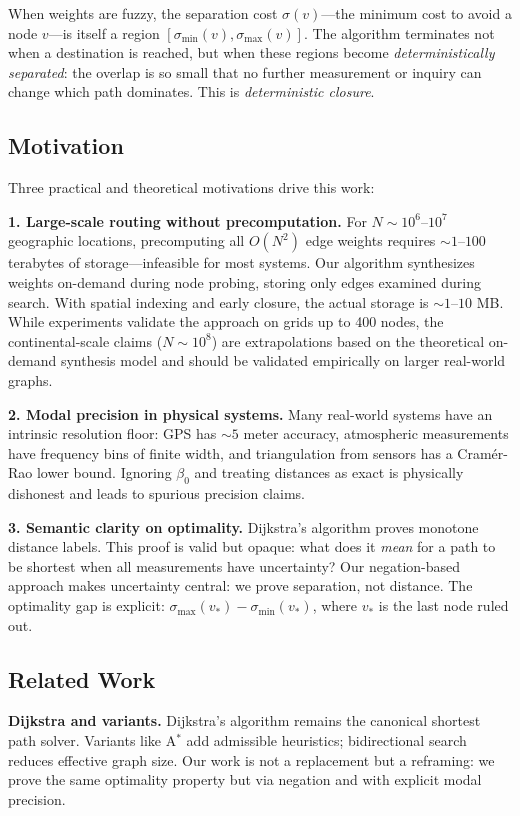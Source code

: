 \documentclass[twocolumn,11pt,a4paper]{article}
\theoremstyle{definition}
\begin{document}
When weights are fuzzy, the separation cost $\sigma(v)$---the minimum cost to avoid a node $v$---is itself a region $[\sigma_{\min}(v), \sigma_{\max}(v)]$. The algorithm terminates not when a destination is reached, but when these regions become \emph{deterministically separated}: the overlap is so small that no further measurement or inquiry can change which path dominates. This is \emph{deterministic closure}.

\subsection{Motivation}

Three practical and theoretical motivations drive this work:

\textbf{1. Large-scale routing without precomputation.} For $N \sim 10^6$--$10^7$ geographic locations, precomputing all $O(N^2)$ edge weights requires $\sim 1$--$100$ terabytes of storage---infeasible for most systems. Our algorithm synthesizes weights on-demand during node probing, storing only edges examined during search. With spatial indexing and early closure, the actual storage is $\sim 1$--$10$ MB. While experiments validate the approach on grids up to 400 nodes, the continental-scale claims ($N \sim 10^8$) are extrapolations based on the theoretical on-demand synthesis model and should be validated empirically on larger real-world graphs.

\textbf{2. Modal precision in physical systems.} Many real-world systems have an intrinsic resolution floor: GPS has $\sim 5$ meter accuracy, atmospheric measurements have frequency bins of finite width, and triangulation from sensors has a Cramér-Rao lower bound. Ignoring $\beta_0$ and treating distances as exact is physically dishonest and leads to spurious precision claims.

\textbf{3. Semantic clarity on optimality.} Dijkstra's algorithm proves monotone distance labels. This proof is valid but opaque: what does it \emph{mean} for a path to be shortest when all measurements have uncertainty? Our negation-based approach makes uncertainty central: we prove separation, not distance. The optimality gap is explicit: $\sigma_{\max}(v_*) - \sigma_{\min}(v_*)$, where $v_*$ is the last node ruled out.

\subsection{Related Work}

\textbf{Dijkstra and variants.} Dijkstra's algorithm \cite{dijkstra1959} remains the canonical shortest path solver. Variants like A$^*$ \cite{hart1968,hart1968a} add admissible heuristics; bidirectional search \cite{goldberg1997} reduces effective graph size. Our work is not a replacement but a reframing: we prove the same optimality property but via negation and with explicit modal precision.
\end{document}
